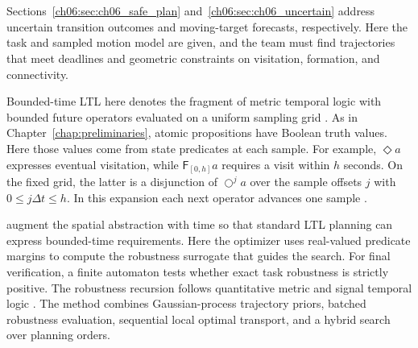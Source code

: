 \section{}
\label{ch06:sec:ch06_stl}

\begin{revision}
Sections~\ref{ch06:sec:ch06_safe_plan} and~\ref{ch06:sec:ch06_uncertain}
address uncertain transition outcomes and moving-target forecasts,
respectively. Here the task and sampled motion model are given, and the
team must find trajectories that meet deadlines and geometric constraints
on visitation, formation, and connectivity.

Bounded-time LTL here denotes the fragment of metric temporal logic
with bounded future operators evaluated on a uniform sampling grid
\citep{koymans1990specifying}. As in Chapter~\ref{chap:preliminaries},
atomic propositions have Boolean truth values. Here those values come
from state predicates at each sample. For example, $\Diamond a$ expresses
eventual visitation, while $\mathsf{F}_{[0,h]}a$ requires a visit within
$h$ seconds. On the fixed grid, the latter is a disjunction of
$\bigcirc^j a$ over the sample offsets $j$ with $0\le j\Delta t\le h$.
In this expansion each next operator advances one sample
\citep{alsmann2025metric}.

\citet{maity2015motion} augment the spatial abstraction with time so
that standard LTL planning can express bounded-time requirements.
Here the optimizer uses real-valued predicate margins to compute the
robustness surrogate that guides the search. For final verification, a
finite automaton tests whether exact task robustness is strictly positive.
The robustness recursion
follows quantitative metric and signal temporal logic
\citep{fainekos2009robustness,donze2010robust}.
The method combines Gaussian-process trajectory priors, batched
robustness evaluation, sequential local optimal transport, and a hybrid
search over planning orders.
\end{revision}


\subsection{}
\label{ch06:subsec:problem_formulation}

